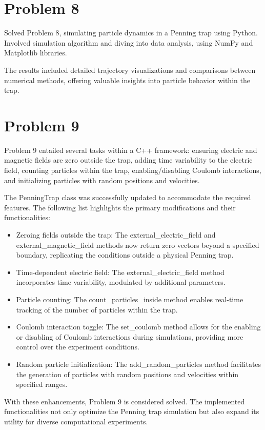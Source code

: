 \documentclass{article}
\begin{document}
\section{Problem 8}

Solved Problem 8, simulating particle dynamics in a Penning trap using Python. Involved simulation algorithm and diving into data analysis, using NumPy and Matplotlib libraries. 

The results included detailed trajectory visualizations and comparisons between numerical methods, offering valuable insights into particle behavior within the trap.





\section{Problem 9}
Problem 9 entailed several tasks within a C++ framework: ensuring electric and magnetic fields are zero outside the trap, adding time variability to the electric field, counting particles within the trap, enabling/disabling Coulomb interactions, and initializing particles with random positions and velocities.


The PenningTrap class was successfully updated to accommodate the required features. The following list highlights the primary modifications and their functionalities:
\begin{itemize}
    \item Zeroing fields outside the trap: The external\_electric\_field and external\_magnetic\_field methods now return zero vectors beyond a specified boundary, replicating the conditions outside a physical Penning trap.
    \item Time-dependent electric field: The external\_electric\_field method incorporates time variability, modulated by additional parameters.
    \item Particle counting: The count\_particles\_inside method enables real-time tracking of the number of particles within the trap.
    \item Coulomb interaction toggle: The set\_coulomb method allows for the enabling or disabling of Coulomb interactions during simulations, providing more control over the experiment conditions.
    \item Random particle initialization: The add\_random\_particles method facilitates the generation of particles with random positions and velocities within specified ranges.
\end{itemize}

With these enhancements, Problem 9 is considered solved. The implemented functionalities not only optimize the Penning trap simulation but also expand its utility for diverse computational experiments.
\end{document}
